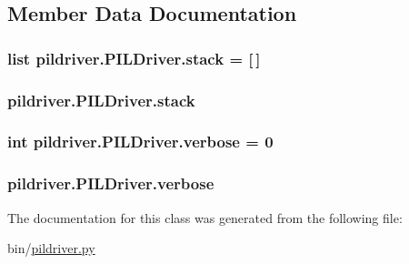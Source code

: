 \subsection{Member Data Documentation}
\hypertarget{classpildriver_1_1_p_i_l_driver_a4ffb2e8f7669cd8bc1ee1bb0dc6c2cd0}{
\subsubsection[{stack}]{\setlength{\rightskip}{0pt plus 5cm}list pildriver.\-P\-I\-L\-Driver.\-stack = \mbox{[}$\,$\mbox{]}\hspace{0.3cm}{\ttfamily [static]}}}\label{classpildriver_1_1_p_i_l_driver_a4ffb2e8f7669cd8bc1ee1bb0dc6c2cd0}
\hypertarget{classpildriver_1_1_p_i_l_driver_ae212e95c0bd3575083547765e7c022b7}{
\subsubsection[{stack}]{\setlength{\rightskip}{0pt plus 5cm}pildriver.\-P\-I\-L\-Driver.\-stack}}\label{classpildriver_1_1_p_i_l_driver_ae212e95c0bd3575083547765e7c022b7}
\hypertarget{classpildriver_1_1_p_i_l_driver_aeb2dfb6910101e7e92ce448c3e67826a}{
\subsubsection[{verbose}]{\setlength{\rightskip}{0pt plus 5cm}int pildriver.\-P\-I\-L\-Driver.\-verbose = 0\hspace{0.3cm}{\ttfamily [static]}}}\label{classpildriver_1_1_p_i_l_driver_aeb2dfb6910101e7e92ce448c3e67826a}
\hypertarget{classpildriver_1_1_p_i_l_driver_aae024b0073fe82381ff1bedcdb82373d}{
\subsubsection[{verbose}]{\setlength{\rightskip}{0pt plus 5cm}pildriver.\-P\-I\-L\-Driver.\-verbose}}\label{classpildriver_1_1_p_i_l_driver_aae024b0073fe82381ff1bedcdb82373d}


The documentation for this class was generated from the following file\-:\begin{DoxyCompactItemize}
\item 
bin/\hyperlink{pildriver_8py}{pildriver.\-py}\end{DoxyCompactItemize}
